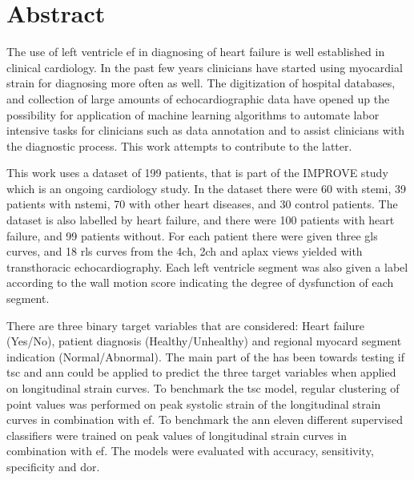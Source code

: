 \section*{Abstract}
%

The use of left ventricle \acrfull{ef} in diagnosing of heart failure is well established in clinical cardiology. In the past few years clinicians have started using myocardial strain for diagnosing more often as well. The digitization of hospital databases, and collection of large amounts of echocardiographic data have opened up the possibility for application of machine learning algorithms to automate labor intensive tasks for clinicians such as data annotation and to assist clinicians with the diagnostic process. This work attempts to contribute to the latter. \bigskip

This work uses a dataset of 199 patients, that is part of the IMPROVE study which is an ongoing cardiology study. In the dataset there were 60 with \acrlong{stemi}, 39 patients with \acrlong{nstemi}, 70 with other heart diseases, and 30 control patients. The dataset is also labelled by heart failure, and there were 100 patients with heart failure, and 99 patients without. For each patient there were given three \acrlong{gls} curves, and 18 \acrlong{rls} curves from the \acrlong{4ch}, \acrlong{2ch} and \acrlong{aplax} views yielded with transthoracic echocardiography. Each left ventricle segment was also given a label according to the wall motion score indicating the degree of dysfunction of each segment. \bigskip

There are three binary target variables that are considered: Heart failure (Yes/No), patient diagnosis (Healthy/Unhealthy) and regional myocard segment indication (Normal/Abnormal). The main part of the has been towards testing if \acrfull{tsc} and \acrfull{ann} could be applied to predict the three target variables when applied on longitudinal strain curves. To benchmark the \acrshort{tsc} model, regular clustering of point values was performed on peak systolic strain of the longitudinal strain curves in combination with \acrshort{ef}. To benchmark the \acrfull{ann} eleven different supervised classifiers were trained on peak values of longitudinal strain curves in combination with \acrshort{ef}. The models were evaluated with accuracy, sensitivity, specificity and \acrfull{dor}. \bigskip

